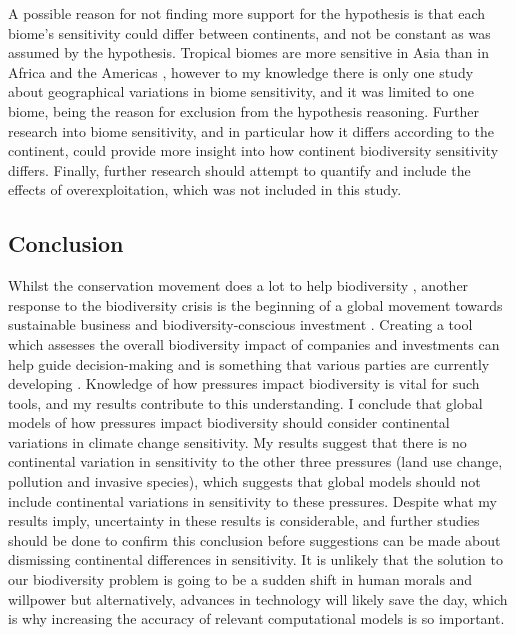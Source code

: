 \documentclass[11pt, a4paper, titlepage]{article}
\begin{document}
     A possible reason for not finding more support for the hypothesis is that each biome's sensitivity could differ between continents, and not be constant as was assumed by the hypothesis. Tropical biomes are more sensitive in Asia than in Africa and the Americas \citep{gibson2011primary}, however to my knowledge there is only one study about geographical variations in biome sensitivity, and it was limited to one biome, being the reason for exclusion from the hypothesis reasoning. Further research into biome sensitivity, and in particular how it differs according to the continent, could provide more insight into how continent biodiversity sensitivity differs. Finally, further research should attempt to quantify and include the effects of overexploitation, which was not included in this study. 
        
	\subsection*{Conclusion}
	
    Whilst the conservation movement does a lot to help biodiversity \citep{sandbrook2019global}, another response to the biodiversity crisis \citep{ogar2020science} is the beginning of a global movement towards sustainable business and biodiversity-conscious investment \citep{pri2020, worldeconomicforum2020, wwf2020}. Creating a tool which assesses the overall biodiversity impact of companies and investments can help guide decision-making and is something that various parties are currently developing \citep{worldbenchmarkingalliance_2022, iccs_2020}. Knowledge of how pressures impact biodiversity is vital for such tools, and my results contribute to this understanding. I conclude that global models of how pressures impact biodiversity should consider continental variations in climate change sensitivity. My results suggest that there is no continental variation in sensitivity to the other three pressures (land use change, pollution and invasive species), which suggests that global models should not include continental variations in sensitivity to these pressures. Despite what my results imply, uncertainty in these results is considerable, and further studies should be done to confirm this conclusion before suggestions can be made about dismissing continental differences in sensitivity.     It is unlikely that the solution to our biodiversity problem is going to be a sudden shift in human morals and willpower but alternatively, advances in technology will likely save the day, which is why increasing the accuracy of relevant computational models is so important. 
    \clearpage
    
\end{document}
